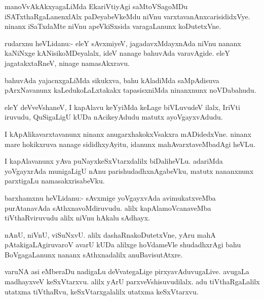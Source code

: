 \documentclass{article}
\begin{document}
\begin{mn}%
manoVvAkAkxyagaLiMda EkariVtiyAgi saMtoVSagoMDu iSATxthaRgaLanenxlAlx
paDeyabeVkeMdu niVnu varxtavanAnxcarisididxVye. ninanx iSaTxdaMte
niVnu apeVkiSxsida varagaLanunx koDutetxVne.
\end{mn}

\begin{mn}
rudarxnu heVLidanu:- eleY sAvxmiyeV, jagadavxMdayxnAda niVnu nananx
kaNiNxge kANisikoMDeyalalx, ideV nanage bahuvAda varavAgide. eleY
jagatakxtaRneV, ninage namasAkxravu.
\end{mn}

\begin{mn}
bahuvAda yajacnxgaLiMda sikukxva, bahu kAladiMda saMpAdisuva
pArxNavanunx kaLedukoLaLxtakakx tapasisxniMda ninanxnunx noVDabahudu.
\end{mn}

\begin{mn}
eleY deVveVshaneV, I kapAlavu keYyiMda keLage biVLuvudeV ilalx, IriVti
iruvudu, QuSigaLigU kUDa nAcikeyAdudu matutx ayoVgayxvAdudu.
\end{mn}

\begin{mn}
I kApAlikavarxtavanunx ninanx anugarxhakokxVsakxra mADidedxVne. ninanx
mare hokikxruva nanage sididhxyAyitu, idanunx mahAvarxtaveMbadAgi heVLu.
\end{mn}

\begin{mn}%
I kapAlavanunx yAva puNayxkeSxVtarxdalilx biDaliheVLu. adariMda
yoVgayxrAda munigaLigU nAnu parishudadhxnAgabeVku, matutx nananxnunx
parxtigaLu namasakxrisabeVku.
\end{mn}

\begin{mn}%
barxhamxnu heVLidanu:- sAvxmige yoVgayxvAda avimukatxveMba
purAtanavAda sAthxnavoMdiruvudu. alilx kapAlamoVcanaveMba
tiVthaRviruvudu alilx niVnu hAkalu sAdhayx.
\end{mn}

\begin{mn}
nAnU, niVnU, viSuNxvU. alilx dashaRnakoDutetxVne, yAru mahA
pAtakigaLAgiruvaroV avarU kUDa alilxge hoVdameVle shudadhxrAgi bahu
BoVgagaLanunx nananx sAthxnadalilx anuBavisutAtxre.
\end{mn}

\begin{mn}%
varuNA asi eMberaDu nadigaLu deVvategaLige pirxyavAduvugaLive. avugaLa
madhayxveV keSxVtarxvu. alilx yArU parxveVshisuvudilalx. adu
tiVthaRgaLalilx utatxma tiVthaRvu, keSxVtarxgalalilx utatxma keSxVtarxvu.
\end{mn}
\end{document}

